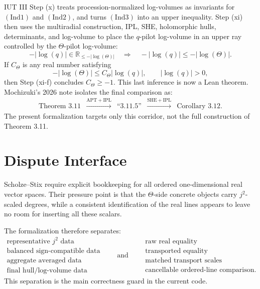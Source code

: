 \documentclass[11pt]{article}
\newcommand{\R}{\mathbb{R}}
\begin{document}
IUT III Step (x) treats procession-normalized log-volumes as invariants for
\((\mathrm{Ind1})\) and \((\mathrm{Ind2})\), and turns \((\mathrm{Ind3})\) into
an upper inequality.  Step (xi) then uses the multiradial construction, IPL, SHE,
holomorphic hulls, determinants, and log-volume to place the \(q\)-pilot
log-volume in an upper ray controlled by the \(\Theta\)-pilot log-volume:
\[
  -|\log(q)| \in \R_{\le -|\log(\Theta)|}
  \quad\Rightarrow\quad
  -|\log(q)| \le -|\log(\Theta)|.
\]
If \(C_\Theta\) is any real number satisfying
\[
  -|\log(\Theta)|\le C_\Theta|\log(q)|,\qquad |\log(q)|>0,
\]
then Step (xi-f) concludes \(C_\Theta\ge-1\).  This last inference is now a
Lean theorem.
Mochizuki's 2026 note isolates the final comparison as:
\[
\begin{array}{ccccc}
\text{Theorem 3.11}
& \xrightarrow{\mathrm{APT}+\mathrm{IPL}}
& \text{``3.11.5''}
& \xrightarrow{\mathrm{SHE}+\mathrm{IPL}}
& \text{Corollary 3.12}.
\end{array}
\]
The present formalization targets only this corridor, not the full construction
of Theorem 3.11.

\section{Dispute Interface}

Scholze--Stix require explicit bookkeeping for all ordered one-dimensional real
vector spaces.  Their pressure point is that the \(\Theta\)-side concrete
objects carry \(j^2\)-scaled degrees, while a consistent identification of the
real lines appears to leave no room for inserting all these scalars.

The formalization therefore separates:
\[
\begin{array}{c}
\text{representative } j^2 \text{ data}\\
\text{balanced sign-compatible data}\\
\text{aggregate averaged data}\\
\text{final hull/log-volume data}
\end{array}
\qquad
\text{and}
\qquad
\begin{array}{c}
\text{raw real equality}\\
\text{transported equality}\\
\text{matched transport scales}\\
\text{cancellable ordered-line comparison.}
\end{array}
\]
This separation is the main correctness guard in the current code.
\end{document}
